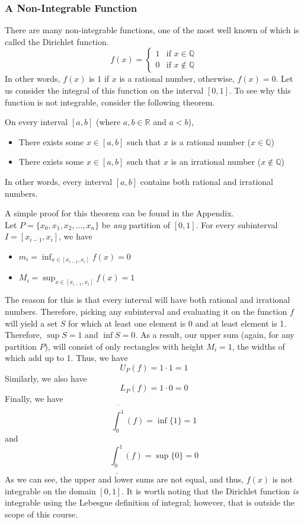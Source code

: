 \documentclass[10pt]{article}
\def\Q{{\mathbb Q}}
\def\R{{\mathbb R}}
\newenvironment{theorem}[1][]{\begin{tcolorbox}[colframe=_blue,colback=_blue2,title=Theorem. \ifthenelse{\isempty{#1}}{}{(#1)}
]}{\end{tcolorbox}}
\newcommand{\emptyline}[0]{\\\hfill$~$\\}
\begin{document}
\subsubsection{A Non-Integrable Function}
There are many non-integrable functions, one of the most well known of which is called the Dirichlet function.
$$
    f(x)=\begin{cases}1&\text{if $x\in\Q$}\\0&\text{if $x\notin\Q$}\end{cases}
$$
In other words, $f(x)$ is $1$ if $x$ is a rational number, otherwise, $f(x)=0$. Let us consider the integral of this function on the interval $[0,1]$. To see why this function is not integrable, consider the following theorem.
\begin{theorem}[``Rational Number Theorem'']
    On every interval $[a,b]$ (where $a,b\in\R$ and $a<b$),
    \begin{itemize}
        \item There exists some $x\in[a,b]$ such that $x$ is a rational number ($x\in \Q$)
        \item There exists some $x\in[a,b]$ such that $x$ is an irrational number ($x\notin \Q$)
    \end{itemize}
    In other words, every interval $[a,b]$ contains both rational and irrational numbers.
\end{theorem}
A simple proof for this theorem can be found in the Appendix.\emptyline
Let $P=\{x_0,x_1,x_2,\dots,x_n\}$ be \textit{any} partition of $[0,1]$. For every subinterval $I=[x_{i-1},x_i]$, we have
\begin{itemize}
    \item $m_i=\displaystyle\inf_{x\in[x_{i-1},x_i]}f(x)=0$
    \item $M_i=\displaystyle\sup_{x\in[x_{i-1},x_i]}f(x)=1$
\end{itemize}
The reason for this is that every interval will have both rational and irrational numbers. Therefore, picking any subinterval and evaluating it on the function $f$ will yield a set $S$ for which at least one element is 0 and at least element is 1. Therefore, $\sup S=1$ and $\inf S=0$. As a result, our upper sum (again, for any partition $P$), will consist of only rectangles with height $M_i=1$, the widths of which add up to 1. Thus, we have
$$
    U_P(f)=1\cdot 1=1
$$
Similarly, we also have
$$
    L_P(f)=1\cdot 0=0
$$
Finally, we have
$$
    \overline{\int_{0}^{1}}(f)=\inf\{1\}=1
$$
and
$$
    \underline{\int_{0}^{1}}(f)=\sup\{0\}=0
$$
As we can see, the upper and lower sums are not equal, and thus, $f(x)$ is not integrable on the domain $[0,1]$. It is worth noting that the Dirichlet function \textit{is} integrable using the Lebesgue definition of integral; however, that is outside the scope of this course.
\end{document}
